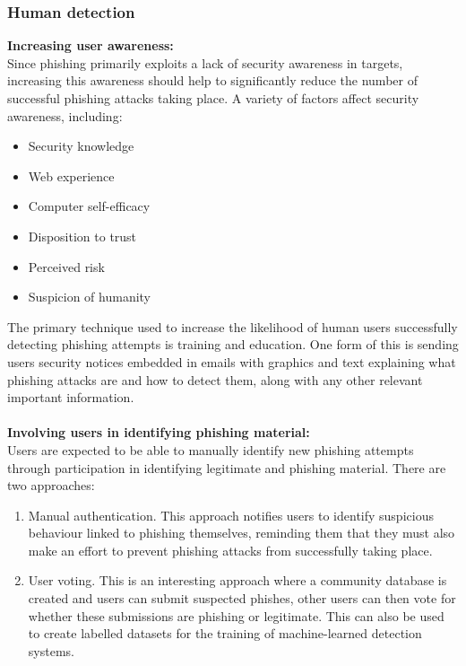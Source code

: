 \documentclass[11pt]{article}
\begin{document}
\subsubsection{Human detection}
\large
\textbf{Increasing user awareness:}\\
\normalsize
Since phishing primarily exploits a lack of security awareness in targets, increasing this awareness should help to significantly reduce the number of successful phishing attacks taking place.
A variety of factors affect security awareness, including:
\begin{itemize}
\item Security knowledge
\item Web experience
\item Computer self-efficacy
\item Disposition to trust
\item Perceived risk
\item Suspicion of humanity
\end{itemize}
The primary technique used to increase the likelihood of human users successfully detecting phishing attempts is training and education.
One form of this is sending users security notices embedded in emails with graphics and text explaining what phishing attacks are and how to detect them, along with any other relevant important information.\\\\
\large
\textbf{Involving users in identifying phishing material:}\\
\normalsize
Users are expected to be able to manually identify new phishing attempts through participation in identifying legitimate and phishing material.
There are two approaches:
\begin{enumerate}
\item Manual authentication. This approach notifies users to identify suspicious behaviour linked to phishing themselves, reminding them that they must also make an effort to prevent phishing attacks from successfully taking place.
\item User voting. This is an interesting approach where a community database is created and users can submit suspected phishes, other users can then vote for whether these submissions are phishing or legitimate. This can also be used to create labelled datasets for the training of machine-learned detection systems.
\end{enumerate}
\end{document}
